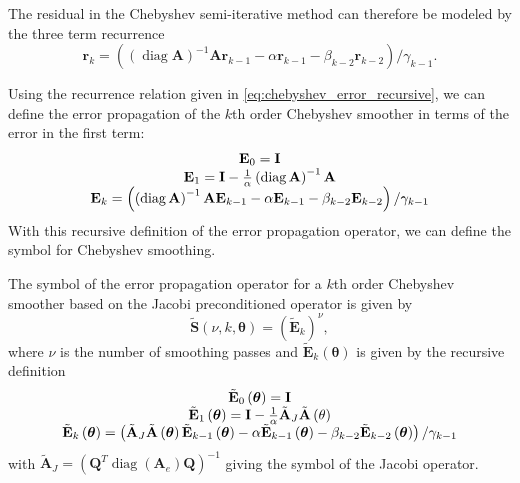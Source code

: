 \documentclass[review]{siamart190516}
\DeclareMathOperator{\diag}{diag}
\begin{document}
The residual in the Chebyshev semi-iterative method can therefore be modeled by the three term recurrence
\begin{equation}
\mathbf{r}_k = \left( \left( \diag {\mathbf{A}} \right)^{-1} {\mathbf{A}} \mathbf{r}_{k - 1} - \alpha \mathbf{r}_{k - 1} - \beta_{k - 2} \mathbf{r}_{k - 2} \right) / \gamma_{k - 1}.
\label{eq:chebyshev_error_recursive}
\end{equation}

Using the recurrence relation given in \cref{eq:chebyshev_error_recursive}, we can define the error propagation of the $k$th order Chebyshev smoother in terms of the error in the first term:
\begin{equation}
\begin{tabular}{c}
$\mathbf{E}_0 = \mathbf{I}$\\
$\mathbf{E}_1 = \mathbf{I} - \frac{1}{\alpha} \left( \diag {\mathbf{A}} \right)^{-1} {\mathbf{A}}$\\
$\mathbf{E}_k = \left(\left( \diag {\mathbf{A}} \right)^{-1} {\mathbf{A}} \mathbf{E}_{k - 1} - \alpha \mathbf{E}_{k - 1} - \beta_{k - 2} \mathbf{E}_{k - 2} \right) / \gamma_{k - 1}$
\end{tabular}
\label{eq:chebyshev_error_propagation}
\end{equation}
With this recursive definition of the error propagation operator, we can define the symbol for Chebyshev smoothing.

\begin{definition}\label{def:chebyshev_symbol}
The symbol of the error propagation operator for a $k$th order Chebyshev smoother based on the Jacobi preconditioned operator is given by
\begin{equation}
\tilde{\mathbf{S}} \left( \nu, k, \boldsymbol{\theta} \right) = \left( \tilde{\mathbf{E}}_k \right)^\nu,
\end{equation}
where $\nu$ is the number of smoothing passes and $\tilde{\mathbf{E}}_k \left( \mathbf{\boldsymbol{\theta}} \right)$ is given by the recursive definition
\begin{equation}
\begin{tabular}{c}
$\tilde{\mathbf{E}}_0 \left( \boldsymbol{\theta} \right) = \mathbf{I}$\\
$\tilde{\mathbf{E}}_1 \left( \boldsymbol{\theta} \right) = \mathbf{I} - \frac{1}{\alpha} \tilde{\mathbf{A}}_J \tilde{\mathbf{A}} \left( \mathbf{\theta} \right)$\\
$\tilde{\mathbf{E}}_k \left( \boldsymbol{\theta} \right) = \left( \tilde{\mathbf{A}}_J \tilde{\mathbf{A}} \left( \boldsymbol{\theta} \right) \tilde{\mathbf{E}}_{k - 1} \left( \boldsymbol{\theta} \right) - \alpha \tilde{\mathbf{E}}_{k - 1} \left( \boldsymbol{\theta} \right) - \beta_{k - 2} \tilde{\mathbf{E}}_{k - 2} \left( \boldsymbol{\theta} \right) \right) / \gamma_{k - 1}$
\end{tabular}
\end{equation}
with $\tilde{\mathbf{A}}_J = \left( \mathbf{Q}^T \diag \left( \mathbf{A}_e \right) \mathbf{Q} \right)^{-1}$ giving the symbol of the Jacobi operator.
\end{definition}
\end{document}
